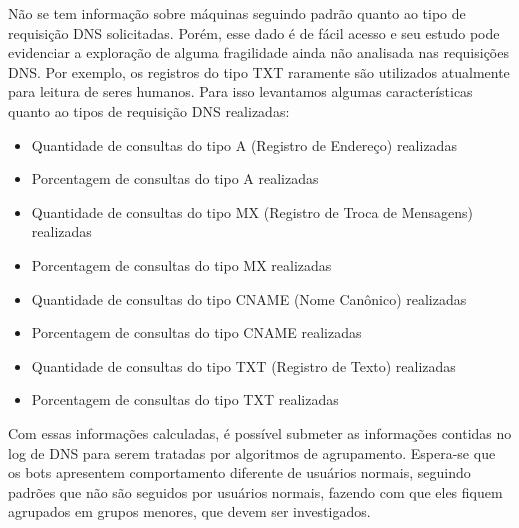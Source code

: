 Não se tem informação sobre máquinas seguindo padrão quanto ao tipo de requisição DNS solicitadas. Porém, esse dado é de fácil acesso e seu estudo pode evidenciar a exploração de alguma fragilidade ainda não analisada nas requisições DNS. Por exemplo, os registros do tipo TXT raramente são utilizados atualmente para leitura de seres humanos. Para isso levantamos algumas características quanto ao tipos de requisição DNS realizadas:

\begin{itemize}
\item Quantidade de consultas do tipo A (Registro de Endereço) realizadas
\item Porcentagem de consultas do tipo A realizadas
\item Quantidade de consultas do tipo MX (Registro de Troca de Mensagens) realizadas
\item Porcentagem de consultas do tipo MX realizadas
\item Quantidade de consultas do tipo CNAME (Nome Canônico) realizadas
\item Porcentagem de consultas do tipo CNAME realizadas
\item Quantidade de consultas do tipo TXT (Registro de Texto) realizadas
\item Porcentagem de consultas do tipo TXT realizadas
\end{itemize}

Com essas informações calculadas, é possível submeter as informações contidas no log de DNS para serem tratadas por algoritmos de agrupamento. Espera-se que os bots apresentem comportamento diferente de usuários normais, seguindo padrões que não são seguidos por usuários normais, fazendo com que eles fiquem agrupados em grupos menores, que devem ser investigados.
